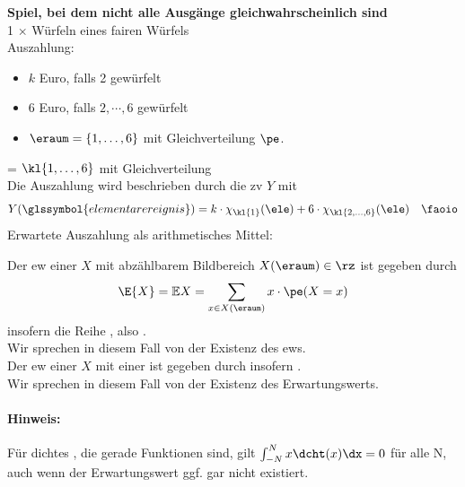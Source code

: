 \begin{bsp}
    \textbf{Spiel, bei dem nicht alle Ausgänge gleichwahrscheinlich sind}  \\
    1 $\times$ Würfeln eines fairen Würfels \\
    Auszahlung:
    \begin{itemize}
        \item $k$ Euro, falls 2 gewürfelt
        \item 6 Euro, falls $2, \cdots , 6$ gewürfelt
        \item \(
        \eraum = \{1,\dots,6\}
        \) mit Gleichverteilung \(\pe\).
    \end{itemize}
     = $\kl{1, \dots, 6}$ mit Gleichverteilung \pe  \\
    Die Auszahlung wird beschrieben durch die \Gls{zv} $Y$ mit
    \[
        Y(\glssymbol{elementarereignis}) = k \cdot \chi_{\kl{1}}(\ele) + 6 \cdot \chi_{\kl{2, \dots, 6}}(\ele) \quad \faoio
    \]
    Erwartete Auszahlung als arithmetisches Mittel:

\end{bsp}

\begin{defi} 
    Der \Gls{ew} einer \zv $X$ mit abzählbarem Bildbereich $X(\eraum) \in \rz$ ist gegeben durch
    \[
        \E{X} = \mathbb{E} X = \sum_{x\in X(\eraum)} x \cdot \pe (X=x)
    \]
    insofern die Reihe , also . \\
    Wir sprechen in diesem Fall von der Existenz des \Gls{ew}s. \\ \newline
    Der \Gls{ew} einer \zv $X$ mit einer \dichte {} ist gegeben durch
    insofern . \\
    Wir sprechen in diesem Fall von der Existenz des Erwartungswerts.

    \paragraph{Hinweis:} Für \glspl{dichte} \dcht, die gerade Funktionen sind, gilt \(\int_{-N}^N x \dcht (x) \dx = 0\) für
    alle N, auch wenn der Erwartungswert ggf.
    gar nicht existiert.
\end{defi}

